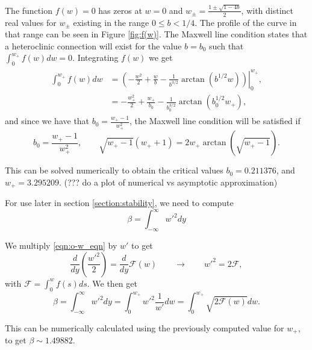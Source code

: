 The function $f(w)=0$ has zeros at $w=0$ and $w_{\pm} = \frac{1\pm\sqrt{1-4b}}{2}$, with distinct real values for $w_{\pm}$ existing in the range $0\le b<1/4$. The profile of the curve in that range can be seen in Figure \eqref{fig:f(w)}. The Maxwell line condition states that a heteroclinic connection will exist for the value $b=b_0$ such that $\int_0^{w_+} f(w)dw = 0$. Integrating $f(w)$ we get
% 
\begin{equation*}
\begin{split}
\begin{aligned}
  \int_0^{w_+} f(w)dw &= \left.\left(-\frac{w^2}{2} + \frac{w}{b} - \frac{1}{b^{3/2}}\arctan(b^{1/2}w) \right)\right|_0^{w_+},\\
  & = -\frac{w_+^2}{2} + \frac{w_+}{b_0} - \frac{1}{b_0^{3/2}}\arctan(b_0^{1/2}w_+),
\end{aligned}
\end{split}
\end{equation*}
% 
and since we have that $b_0 = \frac{w_+-1}{w_+^2}$, the Maxwell line condition will be satisfied if
% 
\begin{equation}
\label{eqn:maxwell2}
b_0 = \frac{w_+-1}{w_+^2},\qquad \sqrt{w_+-1}(w_++1)=2w_+\arctan(\sqrt{w_+-1}).
\end{equation}

This can be solved numerically to obtain the critical values $b_0 = 0.211376$, and $w_+ = 3.295209$. (??? do a plot of numerical vs asymptotic approximation)

For use later in section \eqref{section:stability}, we need to compute
% 
$$
\beta = \int_{-\infty}^{\infty}w'^2dy
$$
% 

We multiply \eqref{eqn:o-w_eqn} by $w'$ to get 
% 
\begin{equation*}
  \frac{d}{dy}\left(\frac{w'^2}{2} \right)=\frac{d}{dy}\mathcal{F}(w)\qquad\rightarrow\qquad w'^2 = 2\mathcal{F},
\end{equation*}
% 
with $\mathcal{F} = \int_0^wf(s)ds$. We then get
% 
\begin{equation}
\label{eqn:o-beta}
  \beta = \int_{-\infty}^{\infty}w'^2dy = \int_{0}^{w_+}w'^2\frac{1}{w'} dw = \int_{0}^{w_+}\sqrt{2\mathcal{F}(w)}dw.
\end{equation}
% 

This can be numerically calculated using the previously computed value for $w_+$, to get $\beta\sim1.49882$.

